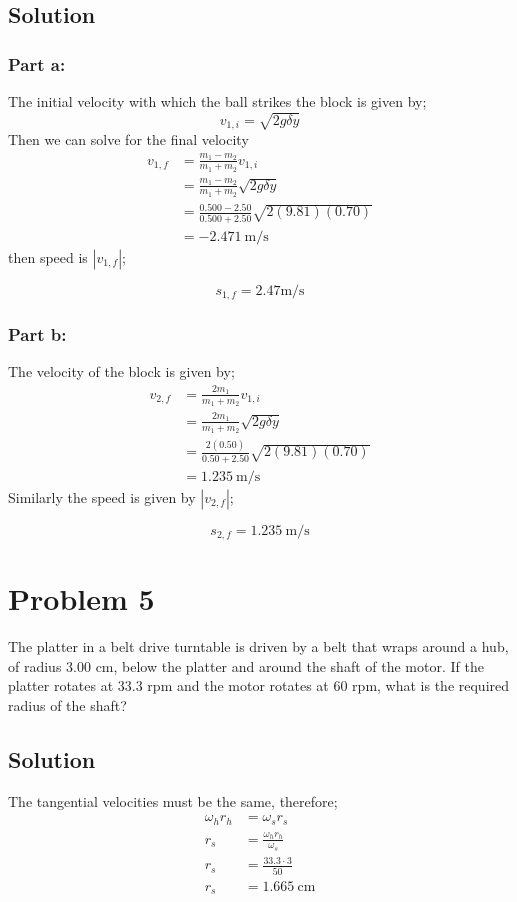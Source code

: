 \documentclass{article}
\begin{document}
\subsection*{Solution}
\subsubsection*{Part a:}
The initial velocity with which the ball strikes the block is given by;
\[
	v_{1,i} = \sqrt{2g \delta y}
\]
Then we can solve for the final velocity
\begin{align*}
	v_{1,f} &= \frac{m_1 - m_2}{m_1 + m_2} v_{1,i} \\
		&= \frac{m_1 - m_2}{m_1 + m_2} \sqrt{2g \delta y} \\
		&= \frac{0.500 - 2.50}{0.500 + 2.50} \sqrt{2 (9.81)(0.70)} \\
		&= -2.471\ \text{m}/\text{s}
\end{align*}
then speed is $|v_{1,f}|$;

\[
	\boxed{s_{1,f} = 2.47\text{m}/\text{s}}
\]

\subsubsection*{Part b:}
The velocity of the block is given by;
\begin{align*}
	v_{2,f} &= \frac{2 m_1}{m_1 + m_2}v_{1,i} \\
		&= \frac{2 m_1}{m_1 + m_2} \sqrt{2g \delta y} \\
		&= \frac{2(0.50)}{0.50 + 2.50} \sqrt{2(9.81)(0.70)} \\
		&= 1.235\ \text{m}/\text{s}
\end{align*}
Similarly the speed is given by $|v_{2,f}|$;

\[
	\boxed{s_{2,f} = 1.235\ \text{m}/\text{s}}
\]

\section*{Problem 5}
The platter in a belt drive turntable is driven by a belt that wraps around a hub, of radius 3.00
cm, below the platter and around the shaft of the motor. If the platter rotates at 33.3 rpm and the
motor rotates at 60 rpm, what is the required radius of the shaft?

\subsection*{Solution}
The tangential velocities must be the same, therefore;
\begin{align*}
	\omega_h r_h &= \omega_s r_s \\
	r_s &= \frac{\omega_h r_h}{\omega_s} \\
	r_s &= \frac{33.3 \cdot 3}{50} \\
	r_s &= \boxed{1.665\ \text{cm}}
\end{align*}
\end{document}
